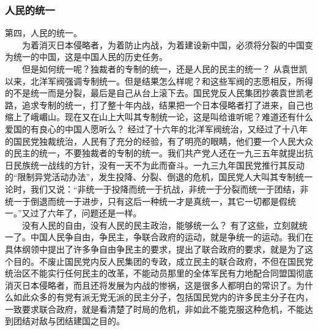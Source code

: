 \documentclass[cn,11pt,chinese]{elegantbook}
\def\myformat#1{\hfil\hfil #1}
\begin{document}
\subsubsection*{\myformat{人民的统一}}
第四，人民的统一。\\
　　为着消灭日本侵略者，为着防止内战，为着建设新中国，必须将分裂的中国变为统一的中国，这是中国人民的历史任务。\\
　　但是如何统一呢？独裁者的专制的统一，还是人民的民主的统一？ 从袁世凯以来，北洋军阀强调专制统一。但是结果怎么样呢？和这些军阀的志愿相反，所得的不是统一而是分裂，最后是自己从台上滚下去。国民党反人民集团抄袭袁世凯老路，追求专制的统一，打了整十年内战，结果把一个日本侵略者打了进来，自己也缩上了峨嵋山。现在又在山上大叫其专制统一论，这是叫给谁听呢？难道还有什么爱国的有良心的中国人愿听么？ 经过了十六年的北洋军阀统治，又经过了十八年的国民党独裁统治，人民有了充分的经验，有了明亮的眼睛，他们要一个人民大众的民主的统一，不要独裁者的专制的统一。我们共产党人还在一九三五年就提出抗日民族统一战线的方针，没有一天不为此而奋斗。一九三九年国民党推行其反动的“限制异党活动办法”，发生投降、分裂、倒退的危机，国民党人大叫其专制统一论时，我们又说：“非统一于投降而统一于抗战，非统一于分裂而统一于团结，非统一于倒退而统一于进步，只有这后一种统一才是真统一，其它一切都是假统一。”又过了六年了，问题还是一样。\\
　　没有人民的自由，没有人民的民主政治，能够统一么？ 有了这些，立刻就统一了。中国人民争自由，争民主，争联合政府的运动，就是争统一的运动。我们在具体纲领中提出了许多争自由争民主的要求，提出了联合政府的要求，就是为了这个目的。不废止国民党内反人民集团的专政，成立民主的联合政府，不但在国民党统治区不能实行任何民主的改革，不能动员那里的全体军民有力地配合同盟国彻底消灭日本侵略者，而且还将发展为内战的惨祸，这是很多人都明白的常识了。为什么如此众多的有党有派无党无派的民主分子，包括国民党内的许多民主分子在内，一致要求联合政府，就是看清楚了时局的危机，非如此不能克服这种危机，不能达到团结对敌与团结建国之目的。\\
\end{document}
